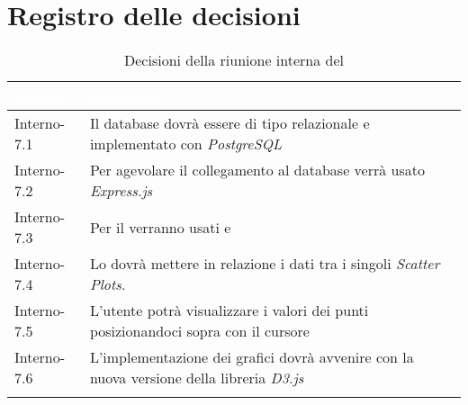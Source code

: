\section{Registro delle decisioni}
{
\renewcommand{\arraystretch}{1.5}
\centering
\begin{longtable}{C{3cm} C{9cm}}
\textcolor{white}{\textbf{Codice}}&
\textcolor{white}{\textbf{Decisione}}\\	

\endhead
		
Interno-7.1 & Il database dovrà essere di tipo relazionale e implementato con \textit{PostgreSQL}\\
Interno-7.2 & Per agevolare il collegamento al database verrà usato \textit{Express.js}\\
Interno-7.3 & Per il  verranno usati \textit{} e \textit{}\\
Interno-7.4 & Lo \textit{} dovrà mettere in relazione i dati tra i singoli \textit{Scatter Plots}.\\
Interno-7.5 & L'utente potrà visualizzare i valori dei punti posizionandoci sopra con il cursore\\
Interno-7.6 & L'implementazione dei grafici dovrà avvenire con la nuova versione della libreria \textit{D3.js}\\
\caption{Decisioni della riunione interna del \Data{}}
\end{longtable}
}
